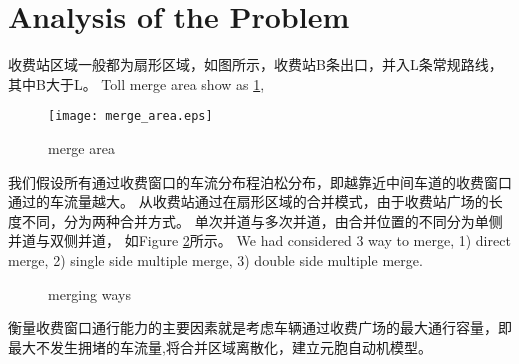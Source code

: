 \documentclass{mcmthesis}
\begin{document}
\lipsum[7]

\section{Analysis of the Problem}
收费站区域一般都为扇形区域，如图所示，收费站B条出口，并入L条常规路线，其中B大于L。
Toll merge area show as \ref{fig:merge_area},\cite{woo1991toll}
\begin{figure}[!h]
	\centering
	\texttt{[image: merge\_area.eps]}
	\caption{merge area}
	\label{fig:merge_area}
\end{figure}
我们假设所有通过收费窗口的车流分布程泊松分布，即越靠近中间车道的收费窗口通过的车流量越大。
从收费站通过在扇形区域的合并模式，由于收费站广场的长度不同，分为两种合并方式。
单次并道与多次并道，由合并位置的不同分为单侧并道与双侧并道，
如Figure \ref{fig:merge_ways}所示。
We had considered 3 way to merge, 1) direct merge, 2) single side multiple merge, 3) double side multiple merge.
\begin{figure}[!htbp]
	\centering
	\caption{merging ways}
	\label{fig:merge_ways}
\end{figure}
衡量收费窗口通行能力的主要因素就是考虑车辆通过收费广场的最大通行容量，即最大不发生拥堵的车流量,将合并区域离散化，建立元胞自动机模型。
\end{document}

